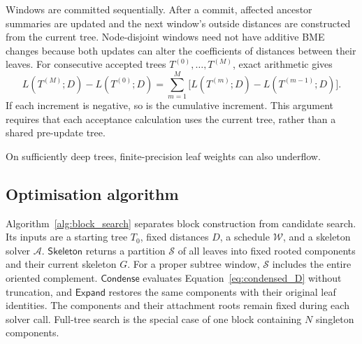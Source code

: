 \documentclass[11pt,a4paper]{article}
\makeatletter
\newcommand{\proc}[1]{\mathsf{#1}}
\DeclareRobustCommand{\_}{\ifmmode\nfss@text{\textunderscore}\else\textunderscore\allowbreak\fi}
\theoremstyle{definition}
\makeatother
\begin{document}
Windows are committed sequentially.
After a commit, affected ancestor summaries are updated and the next window's outside distances are constructed from the current tree.
Node-disjoint windows need not have additive BME changes because both updates can alter the coefficients of distances between their leaves.
For consecutive accepted trees $T^{(0)},\ldots,T^{(M)}$, exact arithmetic gives
\begin{equation}
 L(T^{(M)};D)-L(T^{(0)};D)
 =\sum_{m=1}^M\bigl[L(T^{(m)};D)-L(T^{(m-1)};D)\bigr].
 \label{eq:telescoping}
\end{equation}
If each increment is negative, so is the cumulative increment.
This argument requires that each acceptance calculation uses the current tree, rather than a shared pre-update tree.

On sufficiently deep trees, finite-precision leaf weights can also underflow.

\subsection{Optimisation algorithm}
\label{sec:optimizer}

Algorithm~\ref{alg:block_search} separates block construction from candidate search.
Its inputs are a starting tree $T_0$, fixed distances $D$, a schedule $\mathcal W$, and a skeleton solver $\mathcal A$.
$\proc{Skeleton}$ returns a partition $\mathcal S$ of all leaves into fixed rooted components and their current skeleton $G$.
For a proper subtree window, $\mathcal S$ includes the entire oriented complement.
$\proc{Condense}$ evaluates Equation~\eqref{eq:condensed_D} without truncation, and $\proc{Expand}$ restores the same components with their original leaf identities.
The components and their attachment roots remain fixed during each solver call.
Full-tree search is the special case of one block containing $N$ singleton components.
\end{document}
